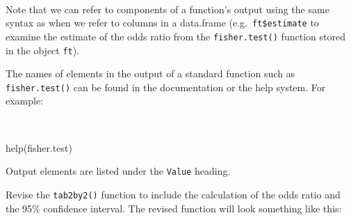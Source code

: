 \documentclass[
  12pt,
  a4paper]{book}
\newenvironment{Shaded}{\begin{snugshade}}{\end{snugshade}}
\newcommand{\FunctionTok}[1]{\textcolor[rgb]{0.00,0.00,0.00}{#1}}
\newcommand{\NormalTok}[1]{#1}
\begin{document}
~

Note that we can refer to components of a function's output using the same syntax as when we refer to columns in a data.frame (e.g.~\texttt{ft\$estimate} to examine the estimate of the odds ratio from the \texttt{fisher.test()} function stored in the object \texttt{ft}).

The names of elements in the output of a standard function such as \texttt{fisher.test()} can be found in the documentation or the help system. For example:

~

\begin{Shaded}
\begin{Highlighting}[]
\FunctionTok{help}\NormalTok{(fisher.test)}
\end{Highlighting}
\end{Shaded}

\newpage

Output elements are listed under the \texttt{Value} heading.

Revise the \texttt{tab2by2()} function to include the calculation of the odds ratio and the 95\% confidence interval. The revised function will look something like this:

~
\end{document}
